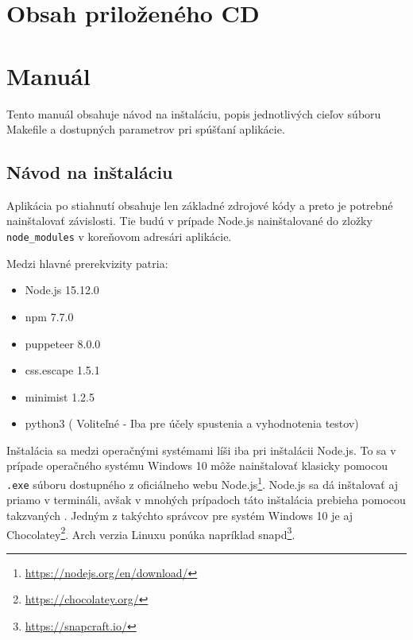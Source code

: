 \chapter{Obsah priloženého CD}


\chapter{Manuál}

Tento manuál obsahuje návod na inštaláciu, popis jednotlivých cieľov súboru Makefile a dostupných parametrov pri spúšťaní aplikácie.

\section{Návod na inštaláciu}

Aplikácia po stiahnutí obsahuje len základné zdrojové kódy a preto je potrebné nainštalovať závislosti. Tie budú v prípade Node.js nainštalované do zložky \texttt{node\_modules} v koreňovom adresári aplikácie.

Medzi hlavné prerekvizity patria:

\begin{itemize}
    \item Node.js 15.12.0
    \item npm 7.7.0
    \item puppeteer 8.0.0
    \item css.escape 1.5.1
    \item minimist 1.2.5
    \item python3 ( Voliteľné - Iba pre účely spustenia a vyhodnotenia testov)
\end{itemize}

Inštalácia sa medzi operačnými systémami líši iba pri inštalácii Node.js. To sa v prípade operačného systému Windows 10 môže nainštalovať klasicky pomocou \texttt{.exe} súboru dostupného z oficiálneho webu Node.js\footnote{\url{https://nodejs.org/en/download/}}. Node.js sa dá inštalovať aj priamo v termináli, avšak v mnohých prípadoch táto inštalácia prebieha pomocou takzvaných . Jedným z takýchto správcov pre systém Windows 10 je aj Chocolatey\footnote{\url{https://chocolatey.org/}}. Arch verzia Linuxu ponúka napríklad snapd\footnote{\url{https://snapcraft.io/}}. 

